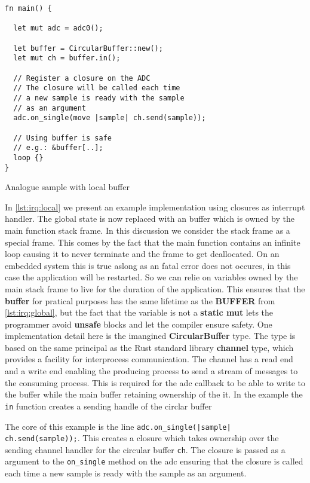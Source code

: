 \begin{listing}[H]
  \begin{verbatim}
fn main() {

  let mut adc = adc0();

  let buffer = CircularBuffer::new();
  let mut ch = buffer.in();

  // Register a closure on the ADC
  // The closure will be called each time
  // a new sample is ready with the sample
  // as an argument
  adc.on_single(move |sample| ch.send(sample));

  // Using buffer is safe
  // e.g.: &buffer[..];
  loop {}
}
  \end{verbatim}
  \caption{Analogue sample with local buffer}
  \label{lst:irq:local}
\end{listing}

In \autoref{lst:irq:local} we present an example implementation using closures as interrupt handler.
The global state is now replaced with an buffer which is owned by the main function stack frame.
In this discussion we consider the stack frame as a special frame.
This comes by the fact that the main function contains an infinite loop causing it to never terminate and the frame to get deallocated.
On an embedded system this is true aslong as an fatal error does not occures, in this case the application will be restarted.
So we can relie on variables owned by the main stack frame to live for the duration of the application.
This ensures that the \textbf{buffer} for pratical purposes has the same lifetime as the \textbf{BUFFER} from \autoref{lst:irq:global}, but the fact that the variable is not a \textbf{static mut} lets the programmer avoid \textbf{unsafe} blocks and let the compiler ensure safety.
One implementation detail here is the imangined \textbf{CircularBuffer} type.
The type is based on the same principal as the Rust standard library \textbf{channel} type, which provides a facility for interprocess communication.
The channel has a read end and a write end enabling the producing process to send a stream of messages to the consuming process.
This is required for the \gls{adc} callback to be able to write to the buffer while the main buffer retaining ownership of the it.
In the example the \texttt{in} function creates a sending handle of the circlar buffer

The core of this example is the line \texttt{adc.on\_single(|sample| ch.send(sample));}.
This creates a closure which takes ownership over the sending channel handler for the circular buffer \texttt{ch}.
The closure is passed as a argument to the \texttt{on\_single} method on the \gls{adc} ensuring that the closure is called each time a new sample is ready with the sample as an argument.

